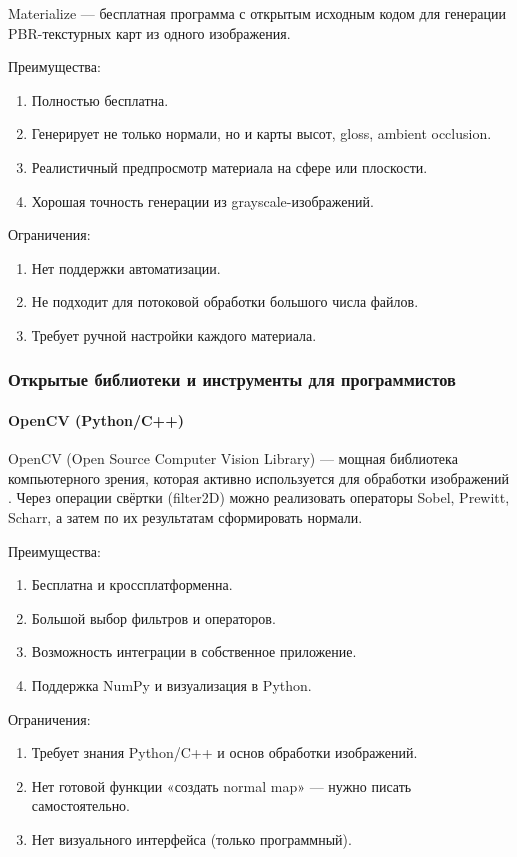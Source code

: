 Materialize — бесплатная программа с открытым исходным кодом для генерации PBR-текстурных карт из одного изображения.

Преимущества:
\begin{enumerate}
	\item Полностью бесплатна.
	\item Генерирует не только нормали, но и карты высот, gloss, ambient occlusion.
	\item Реалистичный предпросмотр материала на сфере или плоскости.
	\item Хорошая точность генерации из grayscale-изображений.
\end{enumerate}

Ограничения:
\begin{enumerate}
	\item Нет поддержки автоматизации.
	\item Не подходит для потоковой обработки большого числа файлов.
	\item Требует ручной настройки каждого материала.
\end{enumerate}
\subsubsection{Открытые библиотеки и инструменты для программистов}
\paragraph{OpenCV (Python/C++)}

OpenCV (Open Source Computer Vision Library) — мощная библиотека компьютерного зрения, которая активно используется для обработки изображений \cite{matveev2023}. Через операции свёртки (filter2D) можно реализовать операторы Sobel, Prewitt, Scharr, а затем по их результатам сформировать нормали.

Преимущества:
\begin{enumerate}
	\item Бесплатна и кроссплатформенна.
	\item Большой выбор фильтров и операторов.
	\item Возможность интеграции в собственное приложение.
	\item Поддержка NumPy и визуализация в Python.
\end{enumerate}

Ограничения:
\begin{enumerate}
	\item Требует знания Python/C++ и основ обработки изображений.
	\item Нет готовой функции «создать normal map» — нужно писать самостоятельно.
	\item Нет визуального интерфейса (только программный).
\end{enumerate}
